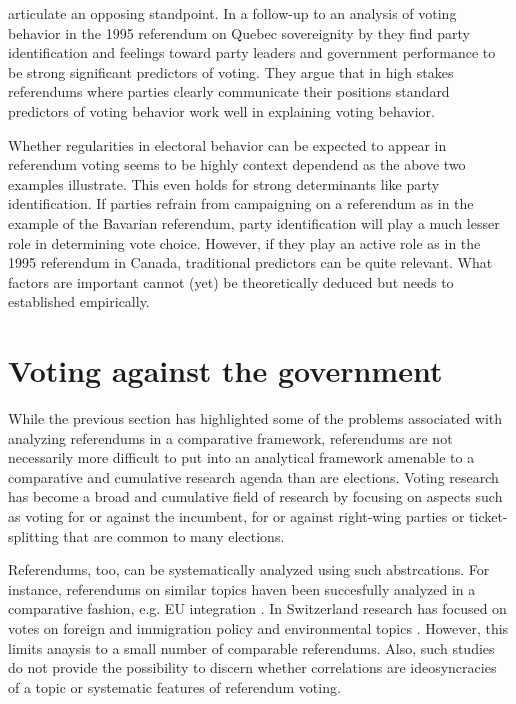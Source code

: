 \documentclass[11pt,a4paper]{article}\usepackage[]{graphicx}\usepackage[]{color}
\begin{document}
    \citet{clarke_referendum_2004} articulate an opposing standpoint. In a follow-up to an analysis of voting behavior in the 1995 referendum on Quebec sovereignity by \citet{nadeau_attitude_1999} they find party identification and feelings toward party leaders and government performance to be strong significant predictors of voting. They argue that in high stakes referendums where parties clearly communicate their positions standard predictors of voting behavior work well in explaining voting behavior.

    Whether regularities in electoral behavior can be expected to appear in referendum voting seems to be highly context dependend as the above two examples illustrate. This even holds for strong determinants like party identification. If parties refrain from campaigning on a referendum as in the example of the Bavarian referendum, party identification will play a much lesser role in determining vote choice. However, if they play an active role as in the 1995 referendum in Canada, traditional predictors can be quite relevant. What factors are important cannot (yet) be theoretically deduced but needs to established empirically.

    \section{Voting against the government}\label{sec:voteagainst} %
    
    While the previous section has highlighted some of the problems associated with analyzing referendums in a comparative framework, referendums are not necessarily more difficult to put into an analytical framework amenable to a comparative and cumulative research agenda than are elections. Voting research has become a broad and cumulative field of research by focusing on aspects such as voting for or against the incumbent, for or against right-wing parties or ticket-splitting that are common to many elections. 
    
    Referendums, too, can be systematically analyzed using such abstrcations. For instance, referendums on similar topics haven been succesfully analyzed in a comparative fashion, e.g. EU integration \citep{hobolt_when_2005}. In Switzerland research has focused on votes on foreign and immigration policy \citep{sciarini_two-level_2009,sciarini_campaign_2011} and environmental topics \citep{bornstein_voting_2008}. However, this limits anaysis to a small number of comparable referendums. Also, such studies do not provide the possibility to discern whether correlations are ideosyncracies of a topic or systematic features of referendum voting.
\end{document}
